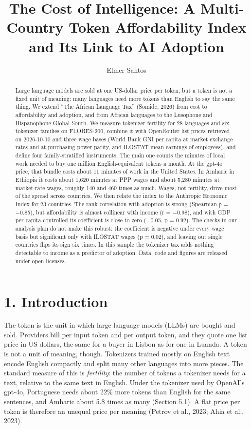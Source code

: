 \documentclass[11pt]{article}
\title{The Cost of Intelligence: A Multi-Country Token Affordability Index and Its Link to AI Adoption}
\author{Elmer Santos}
\date{}
\begin{document}
\maketitle
\begin{abstract}
Large language models are sold at one US-dollar price per token, but a token is not a fixed unit of meaning: many languages need more tokens than English to say the same thing. We extend ``The African Language Tax'' (Somide, 2026) from cost to affordability and adoption, and from African languages to the Lusophone and Hispanophone Global South. We measure tokenizer fertility for 28 languages and six tokenizer families on FLORES-200, combine it with OpenRouter list prices retrieved on 2026-10-10 and three wage bases (World Bank GNI per capita at market exchange rates and at purchasing-power parity, and ILOSTAT mean earnings of employees), and define four family-stratified instruments. The main one counts the minutes of local work needed to buy one million English-equivalent tokens a month. At the gpt-4o price, that bundle costs about 11 minutes of work in the United States. In Amharic in Ethiopia it costs about 1,620 minutes at PPP wages and about 5,280 minutes at market-rate wages, roughly 140 and 460 times as much. Wages, not fertility, drive most of the spread across countries. We then relate the index to the Anthropic Economic Index for 23 countries. The rank correlation with adoption is strong (Spearman ρ = −0.85), but affordability is almost collinear with income (r = −0.98), and with GDP per capita controlled its coefficient is close to zero (−0.05, p = 0.92). The checks in our analysis plan do not make this robust: the coefficient is negative under every wage basis but significant only with ILOSTAT wages (p = 0.02), and leaving out single countries flips its sign six times. In this sample the tokenizer tax adds nothing detectable to income as a predictor of adoption. Data, code and figures are released under open licenses.
\end{abstract}
\section{1. Introduction}

The token is the unit in which large language models (LLMs) are bought and sold. Providers bill per input token and per output token, and they quote one list price in US dollars, the same for a buyer in Lisbon as for one in Luanda. A token is not a unit of meaning, though. Tokenizers trained mostly on English text encode English compactly and split many other languages into more pieces. The standard measure of this is \emph{fertility}: the number of tokens a tokenizer needs for a text, relative to the same text in English. Under the tokenizer used by OpenAI's gpt-4o, Portuguese needs about 22\% more tokens than English for the same sentences, and Amharic about 5.8 times as many (Section 5.1). A flat price per token is therefore an unequal price per meaning (Petrov et al., 2023; Ahia et al., 2023).
\end{document}

